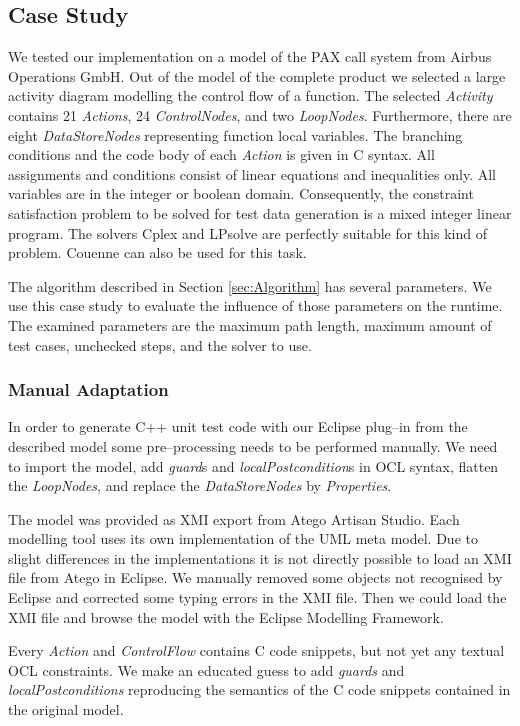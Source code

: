 \documentclass[runningheads,a4paper]{llncs}%
\newcommand{\UMLType}[1]{\textsf{\textit{#1}}} %
\newcommand{\UMLReference}[1]{\textsf{\textit{#1}}} %
\begin{document}
\subsection{Case Study}%
\label{sec:CaseStudy}%
We tested our implementation on a model of the PAX call system from Airbus Operations GmbH. Out of the model of the complete product we selected a large activity diagram modelling the control flow of a function. The selected \UMLType{Activity} contains 21 \UMLType{Actions}, 24 \UMLType{ControlNodes}, and two \UMLType{LoopNodes}. Furthermore, there are eight \UMLType{DataStoreNodes} representing function local variables. The branching conditions and the code body of each \UMLType{Action} is given in C syntax. All assignments and conditions consist of linear equations and inequalities only. All variables are in the integer or boolean domain. Consequently, the constraint satisfaction problem to be solved for test data generation is a mixed integer linear program. The solvers Cplex and LPsolve are perfectly suitable for this kind of problem. Couenne can also be used for this task.

The algorithm described in Section \ref{sec:Algorithm} has several parameters. We use this case study to evaluate the influence of those parameters on the runtime. The examined parameters are the maximum path length, maximum amount of test cases, unchecked steps, and the solver to use.%
\subsubsection{Manual Adaptation}%
In order to generate C++ unit test code with our Eclipse plug--in from the described model some pre--processing needs to be performed manually. We need to import the model, add \UMLReference{guard}s and \UMLReference{localPostcondition}s in OCL syntax, flatten the \UMLType{LoopNodes}, and replace the \UMLType{DataStoreNodes} by \UMLType{Properties}.

The model was provided as XMI export from Atego\textsuperscript{\textregistered} Artisan Studio. Each modelling tool uses its own implementation of the UML meta model. Due to slight differences in the implementations it is not directly %
possible to load an XMI file from Atego\textsuperscript{\textregistered} in Eclipse. We manually removed some objects not recognised by Eclipse and corrected some typing errors in the XMI file. Then we could load the XMI file and browse the model with the Eclipse Modelling Framework.

Every \UMLType{Action} and \UMLReference{ControlFlow} contains C code snippets, but not yet any textual OCL constraints. We make an educated guess to add \UMLReference{guards} and \UMLReference{localPostconditions} reproducing the semantics of the C code snippets contained in the original model.
\end{document}
